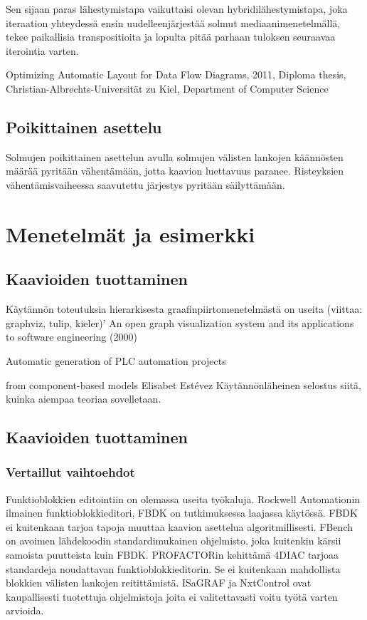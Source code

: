 \documentclass[finnish,12pt]{article}
\begin{document}
Sen sijaan paras lähestymistapa vaikuttaisi olevan hybridilähestymistapa, joka iteraation yhteydessä ensin uudelleenjärjestää solmut mediaanimenetelmällä, tekee paikallisia transpositioita ja lopulta pitää parhaan tuloksen seuraavaa iterointia varten.


Optimizing Automatic Layout for Data Flow Diagrams, 2011, Diploma thesis, Christian-Albrechts-Universität zu Kiel, Department of Computer Science

	\subsection{Poikittainen asettelu}

Solmujen poikittainen asettelun avulla solmujen välisten lankojen käännösten määrää pyritään vähentämään, jotta kaavion luettavuus paranee. Risteyksien vähentämisvaiheessa saavutettu järjestys pyritään säilyttämään.

	\clearpage
	\section{Menetelmät ja esimerkki}
	\subsection{Kaavioiden tuottaminen}

Käytännön toteutuksia hierarkisesta graafinpiirtomenetelmästä on useita (viittaa: graphviz, tulip, kieler)’
An open graph visualization system and its applications to software engineering (2000) 

Automatic generation of PLC automation projects

from component-based models
Elisabet Estévez
Käytännönläheinen selostus siitä, kuinka aiempaa teoriaa sovelletaan.

	\subsection{Kaavioiden tuottaminen}
	\subsubsection{Vertaillut vaihtoehdot}
	
Funktioblokkien editointiin on olemassa useita työkaluja.
Rockwell Automationin ilmainen funktioblokkieditori, FBDK on tutkimuksessa laajassa käytössä.
FBDK ei kuitenkaan tarjoa tapoja muuttaa kaavion asettelua algoritmillisesti.
FBench on avoimen lähdekoodin standardimukainen ohjelmisto, joka kuitenkin kärsii samoista puutteista kuin FBDK.
PROFACTORin kehittämä 4DIAC tarjoaa standardeja noudattavan funktioblokkieditorin.
Se ei kuitenkaan mahdollista blokkien välisten lankojen reitittämistä.
ISaGRAF ja NxtControl ovat kaupallisesti tuotettuja ohjelmistoja joita ei valitettavasti voitu työtä varten arvioida.
\end{document}
